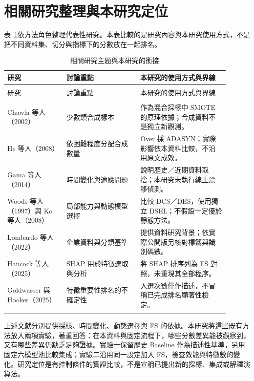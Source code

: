 \section{相關研究整理與本研究定位}

表~\ref{tab:lit-position}依方法角色整理代表性研究。本表比較的是研究內容與本研究使用方式，不是把不同資料集、切分與指標下的分數放在一起排名。

\begingroup\small{}\setlength{\tabcolsep}{4pt}
\begin{longtable}{@{}>{\raggedright\arraybackslash}p{0.24\linewidth}>{\raggedright\arraybackslash}p{0.30\linewidth}>{\raggedright\arraybackslash}p{0.36\linewidth}@{}}
\caption{相關研究主題與本研究的銜接}\label{tab:lit-position}\\
\toprule
研究 & 討論重點 & 本研究的使用方式與界線 \\
\midrule\endfirsthead
\multicolumn{3}{c}{表~\thetable（續）}\\\toprule
研究 & 討論重點 & 本研究的使用方式與界線 \\
\midrule\endhead
\midrule\multicolumn{3}{r}{續下頁}\\\endfoot
\bottomrule\endlastfoot
Chawla 等人（2002）\autocite{chawla2002smote} & 少數類合成樣本 & 作為混合採樣中 SMOTE 的原理依據；合成資料不是獨立新觀測。 \\[4pt]
He 等人（2008）\autocite{he2008adasyn} & 依困難程度分配合成數量 & Over 採 ADASYN；實際影響依本資料比較，不沿用原文成效。 \\[4pt]
Gama 等人（2014）\autocite{gama2014drift} & 時間變化與適應問題 & 說明歷史／近期資料取捨；本研究未執行線上漂移偵測。 \\[4pt]
Woods 等人（1997）與 Ko 等人（2008）\autocite{woods1997local,ko2008dynamic} & 局部能力與動態模型選擇 & 比較 DCS／DES，使用獨立 DSEL；不假設一定優於靜態方法。 \\[4pt]
Lombardo 等人（2022）\autocite{lombardo2022bankruptcy} & 企業資料與分類基準 & 提供資料研究背景；依實際公開版另核對標籤與識別碼數。 \\[4pt]
Hancock 等人（2025）\autocite{hancock2025shapfs} & SHAP 用於特徵選取與分析 & 將 SHAP 排序列為 FS 對照，未重現其全部程序。 \\[4pt]
Goldwasser 與 Hooker（2025）\autocite{goldwasser2025rankings} & 特徵重要性排名的不確定性 & 入選次數僅作描述，不冒稱已完成排名顯著性檢定。 \\*
\end{longtable}
\endgroup

上述文獻分別提供採樣、時間變化、動態選擇與 FS 的依據。本研究將這些既有方法放入兩項實驗，著重回答：在本資料與固定流程下，哪些分數差異能被觀察到，又有哪些差異仍缺乏足夠證據。實驗一保留歷史 Baseline 作為描述性基準，另用固定六模型池比較集成；實驗二沿用同一設定加入 FS，檢查效能與特徵數的變化。研究定位是有控制條件的實證比較，不是宣稱已提出新的採樣、集成或解釋演算法。
\endgroup
